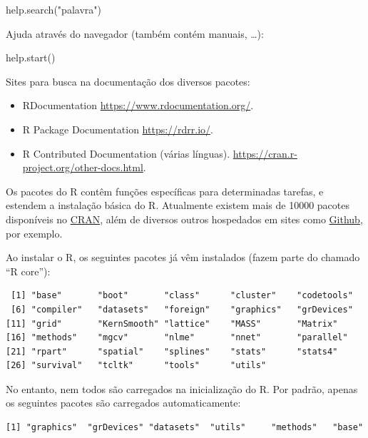 \documentclass[
  10pt,
  a4paper]{book}
\newenvironment{Shaded}{\begin{snugshade}}{\end{snugshade}}
\newcommand{\FunctionTok}[1]{\textcolor[rgb]{0.00,0.00,0.00}{#1}}
\newcommand{\NormalTok}[1]{#1}
\newcommand{\StringTok}[1]{\textcolor[rgb]{0.31,0.60,0.02}{#1}}
\providecommand{\tightlist}{%
  \setlength{\itemsep}{0pt}\setlength{\parskip}{0pt}}
\begin{document}
\begin{Shaded}
\begin{Highlighting}[]
\FunctionTok{help.search}\NormalTok{(}\StringTok{"palavra"}\NormalTok{)}
\end{Highlighting}
\end{Shaded}

Ajuda através do navegador (também contém manuais, \ldots):

\begin{Shaded}
\begin{Highlighting}[]
\FunctionTok{help.start}\NormalTok{()}
\end{Highlighting}
\end{Shaded}

Sites para busca na documentação dos diversos pacotes:

\begin{itemize}
\tightlist
\item
  RDocumentation \url{https://www.rdocumentation.org/}.
\item
  R Package Documentation \url{https://rdrr.io/}.
\item
  R Contributed Documentation (várias línguas).
  \url{https://cran.r-project.org/other-docs.html}.
\end{itemize}

Os pacotes do R contêm funções específicas para determinadas tarefas, e
estendem a instalação básica do R. Atualmente existem mais de 10000
pacotes disponíveis no
\href{http://cran-r.c3sl.ufpr.br/web/packages/index.html}{CRAN}, além de
diversos outros hospedados em sites como \href{https://github.com}{Github},
por exemplo.

Ao instalar o R, os seguintes pacotes já vêm instalados (fazem parte do
chamado ``R core''):

\begin{verbatim}
 [1] "base"       "boot"       "class"      "cluster"    "codetools" 
 [6] "compiler"   "datasets"   "foreign"    "graphics"   "grDevices" 
[11] "grid"       "KernSmooth" "lattice"    "MASS"       "Matrix"    
[16] "methods"    "mgcv"       "nlme"       "nnet"       "parallel"  
[21] "rpart"      "spatial"    "splines"    "stats"      "stats4"    
[26] "survival"   "tcltk"      "tools"      "utils"     
\end{verbatim}

No entanto, nem todos são carregados na inicialização do R. Por padrão,
apenas os seguintes pacotes são carregados automaticamente:

\begin{verbatim}
[1] "graphics"  "grDevices" "datasets"  "utils"     "methods"   "base"     
\end{verbatim}
\end{document}
